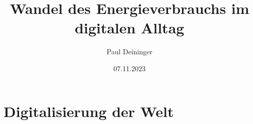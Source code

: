 \documentclass{wseminar}
\title{Wandel des Energieverbrauchs im digitalen Alltag}
\author{Paul Deininger}
\date{ 07.11.2023 }
\begin{document}
\begin{sloppypar}
    \maketitle
    \thispagestyle{empty}   %
    \pagebreak
    \tableofcontents        %
    \thispagestyle{empty}   %
    \pagebreak



    \section{Digitalisierung der Welt}	
    
	\pagebreak
	
	
	

\end{sloppypar}
\end{document}
